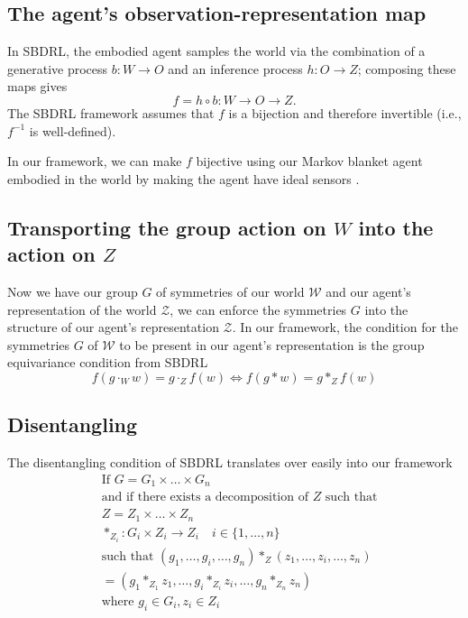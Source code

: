 \subsection{The agent's observation-representation map}

In SBDRL, the embodied agent 
samples the world via the combination of a generative process $b: W \to O$ and an inference process $h: O \to Z$; composing these maps gives
\begin{equation}
    f = h \circ b: W \to O \to Z.
\end{equation}
The SBDRL framework assumes that $f$ is a bijection and therefore invertible (i.e., $f^{-1}$ is well-defined).

In our framework, we can make $f$ bijective using our Markov blanket agent embodied in the world by making the agent have ideal sensors .

\subsection{Transporting the group action on $W$ into the action on $Z$}

Now we have our group $G$ of symmetries of our world $\mathscr{W}$ and our agent's representation of the world $\mathscr{Z}$, we can enforce the symmetries $G$ into the structure of our agent's representation $\mathscr{Z}$.
In our framework, the condition for the symmetries $G$ of $\mathscr{W}$ to be present in our agent's representation is the group equivariance condition from SBDRL
\begin{equation}
    f(g \cdot_{W} w) = g \cdot_{Z} f(w) \iff f(g \ast w) = g \ast_{Z} f(w)
\end{equation}

\subsection{Disentangling}
The disentangling condition of SBDRL translates over easily into our framework
\begin{align}
    &\text{If } G = G_{1} \times \dots \times G_{n} \\
    &\text{and if there exists a decomposition of $Z$ such that} \\
    &Z = Z_{1} \times \dots \times Z_{n} \\
    &*_{Z_{i}}: G_{i} \times Z_{i} \to Z_{i} \quad i \in \{1, \dots, n\} \\
    &\text{such that } (g_{1}, \dots, g_{i}, \dots, g_{n}) \ast_{Z} (z_{1}, \dots, z_{i}, \dots, z_{n}) \\
    &= (g_{1} \ast_{Z_{1}} z_{1}, \dots, g_{i} \ast_{Z_{i}} z_{i}, \dots, g_{n} \ast_{Z_{n}} z_{n} ) \\
    & \text{where } g_{i} \in G_{i}, z_{i} \in Z_{i}
\end{align}

